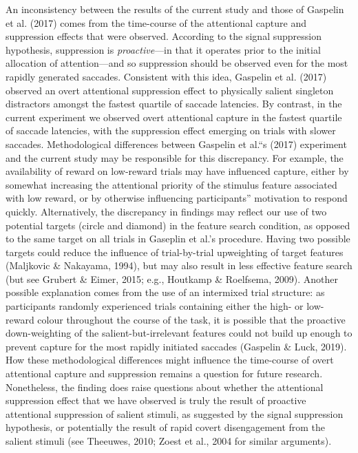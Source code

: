 \documentclass[man, a4paper, noextraspace, 11pt,floatsintext]{apa6}
\theoremstyle{definition}
\theoremstyle{definition}
\theoremstyle{definition}
\theoremstyle{remark}
\begin{document}
An inconsistency between the results of the current study and those of
Gaspelin et al. (2017) comes from the time-course of the attentional
capture and suppression effects that were observed. According to the
signal suppression hypothesis, suppression is \emph{proactive}---in that
it operates prior to the initial allocation of attention---and so
suppression should be observed even for the most rapidly generated
saccades. Consistent with this idea, Gaspelin et al. (2017) observed an
overt attentional suppression effect to physically salient singleton
distractors amongst the fastest quartile of saccade latencies. By
contrast, in the current experiment we observed overt attentional
capture in the fastest quartile of saccade latencies, with the
suppression effect emerging on trials with slower saccades.
Methodological differences between Gaspelin et al.\enquote{s (2017)
experiment and the current study may be responsible for this
discrepancy. For example, the availability of reward on low-reward
trials may have influenced capture, either by somewhat increasing the
attentional priority of the stimulus feature associated with low reward,
or by otherwise influencing participants} motivation to respond quickly.
Alternatively, the discrepancy in findings may reflect our use of two
potential targets (circle and diamond) in the feature search condition,
as opposed to the same target on all trials in Gaseplin et al.'s
procedure. Having two possible targets could reduce the influence of
trial-by-trial upweighting of target features (Maljkovic \& Nakayama,
1994), but may also result in less effective feature search (but see
Grubert \& Eimer, 2015; e.g., Houtkamp \& Roelfsema, 2009). Another
possible explanation comes from the use of an intermixed trial
structure: as participants randomly experienced trials containing either
the high- or low-reward colour throughout the course of the task, it is
possible that the proactive down-weighting of the salient-but-irrelevant
features could not build up enough to prevent capture for the most
rapidly initiated saccades (Gaspelin \& Luck, 2019). How these
methodological differences might influence the time-course of overt
attentional capture and suppression remains a question for future
research. Nonetheless, the finding does raise questions about whether
the attentional suppression effect that we have observed is truly the
result of proactive attentional suppression of salient stimuli, as
suggested by the signal suppression hypothesis, or potentially the
result of rapid covert disengagement from the salient stimuli (see
Theeuwes, 2010; Zoest et al., 2004 for similar arguments).
\end{document}
